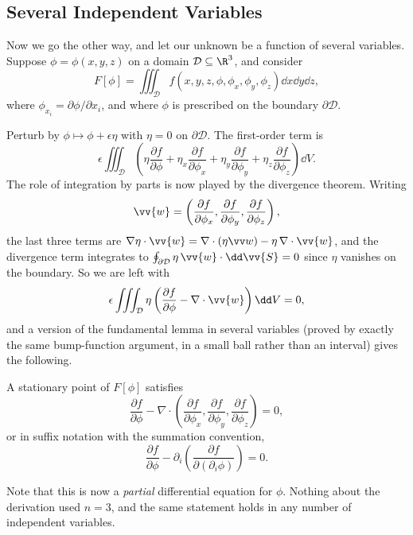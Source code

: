 \documentclass[a4paper]{scrartcl}
\begin{document}
\subsection{Several Independent Variables}

Now we go the other way, and let our unknown be a function of several variables. Suppose $\phi = \phi(x, y, z)$ on a domain $\mathcal{D}\subseteq \R^3$, and consider
$$
F[\phi] = \iiint_{\mathcal{D}} f\left(x, y, z, \phi, \phi_x, \phi_y, \phi_z\right)\dd x \dd y \dd z,
$$
where $\phi_{x_i} = \partial\phi/\partial x_i$, and where $\phi$ is prescribed on the boundary $\partial \mathcal{D}$.

Perturb by $\phi \mapsto \phi + \epsilon \eta$ with $\eta = 0$ on $\partial\mathcal D$. The first-order term is
$$
\epsilon\iiint_{\mathcal D}\left(\eta \frac{\partial f}{\partial \phi} + \eta_x \frac{\partial f}{\partial \phi_x} + \eta_y \frac{\partial f}{\partial \phi_y} + \eta_z \frac{\partial f}{\partial \phi_z}\right)\dd V.
$$
The role of integration by parts is now played by the divergence theorem. Writing
$$
\vv{w} = \left(\frac{\partial f}{\partial \phi_x}, \frac{\partial f}{\partial \phi_y}, \frac{\partial f}{\partial \phi_z}\right),
$$
the last three terms are $\nabla \eta \cdot \vv{w} = \nabla\cdot(\eta \vv w) - \eta\, \nabla\cdot \vv{w}$, and the divergence term integrates to $\oint_{\partial \mathcal D}\eta\, \vv{w}\cdot \dd \vv{S} = 0$ since $\eta$ vanishes on the boundary. So we are left with
$$
\epsilon\iiint_{\mathcal D}\eta\left(\frac{\partial f}{\partial \phi} - \nabla\cdot\vv{w}\right)\dd V = 0,
$$
and a version of the fundamental lemma in several variables (proved by exactly the same bump-function argument, in a small ball rather than an interval) gives the following.

\begin{theorem}
	A stationary point of $F[\phi]$ satisfies
	$$
	\frac{\partial f}{\partial \phi} - \nabla\cdot\left(\frac{\partial f}{\partial \phi_x}, \frac{\partial f}{\partial \phi_y}, \frac{\partial f}{\partial \phi_z}\right) = 0,
	$$
	or in suffix notation with the summation convention,
	$$
	\frac{\partial f}{\partial \phi} - \partial_i\left(\frac{\partial f}{\partial (\partial_i \phi)}\right) = 0.
	$$
\end{theorem}

Note that this is now a \emph{partial} differential equation for $\phi$. Nothing about the derivation used $n = 3$, and the same statement holds in any number of independent variables.
\end{document}
